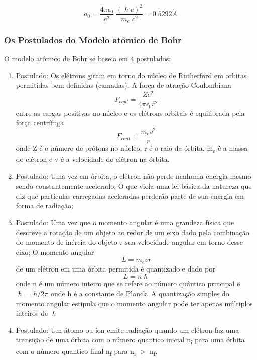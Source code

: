 \documentclass[11pt,a4paper]{article}
\begin{document}
                $$a_0 = \frac{4 \pi \epsilon_0}{e^2} \; \frac{(\hslash c)^2}{m_e \; c^2} = 0.5292 \mathring{A} $$

            \subsubsection{Os Postulados do Modelo atômico de Bohr}

                O modelo atômico de Bohr se baseia em 4 postulados:

                \begin{enumerate}
                    \item Postulado: Os elétrons giram em torno do núcleo de Rutherford em orbitas permitidas bem definidas (camadas). A força de atração Coulombiana $$F_{coul} = \frac{Ze^2 }{4 \pi \epsilon_0 r^2}$$ entre as cargas positivas no núcleo e os elétrons orbitais é equilibrada pela força centrífuga $$F_{cent} = \frac{m_e v^2}{r}$$ onde Z é o número de prótons no núcleo, r é o raio da órbita, m\textsubscript{e} é a massa do elétron e  v é a velocidade do elétron na órbita.
                    
                    \item Postulado: Uma vez em órbita, o elétron não perde nenhuma energia mesmo sendo constantemente acelerado; O que viola uma lei básica da natureza que diz que partículas carregadas aceleradas perderão parte de sua energia em forma de radiação;
                    
                    \item Postulado: Uma vez que o momento angular é uma grandeza física que descreve a rotação de um objeto ao redor de um eixo dado pela combinação do momento de inércia do objeto e sua velocidade angular em torno desse eixo; O momento angular $$L = m_e v r$$ de um elétron em uma órbita permitida é quantizado e dado por $$L = n \hslash$$ onde n é um número inteiro que se refere ao número quântico principal e $\hslash = h / 2 \pi$ onde h é a constante de Planck. A quantização simples do momento angular estipula que o momento angular pode ter apenas múltiplos inteiros de $\hslash$
                    
                    \item Postulado: Um átomo ou íon emite radiação quando um elétron faz uma transição de uma órbita com o número quantico inicial n\textsubscript{i} para uma órbita com o número quantico final n\textsubscript{f} para n\textsubscript{i} $>$ n\textsubscript{f}.
                \end{enumerate}
\end{document}
